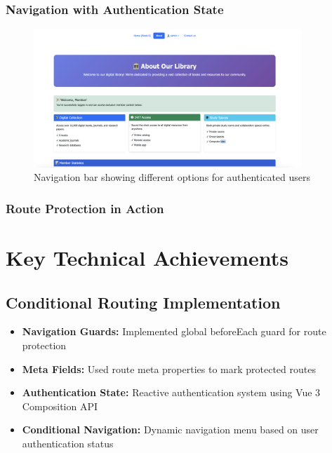 \documentclass[11pt,a4paper]{article}
\begin{document}
\subsubsection{Navigation with Authentication State}

\begin{figure}[h]
     \centering
     \includegraphics[width=0.9\textwidth]{authenticated_navigation.png}
     \caption{Navigation bar showing different options for authenticated users}
     \label{fig:auth_nav}
\end{figure}

\subsubsection{Route Protection in Action}


\newpage

\section{Key Technical Achievements}

\subsection{Conditional Routing Implementation}
\begin{itemize}
    \item \textbf{Navigation Guards:} Implemented global beforeEach guard for route protection
    \item \textbf{Meta Fields:} Used route meta properties to mark protected routes
    \item \textbf{Authentication State:} Reactive authentication system using Vue 3 Composition API
    \item \textbf{Conditional Navigation:} Dynamic navigation menu based on user authentication status
\end{itemize}
\end{document}
